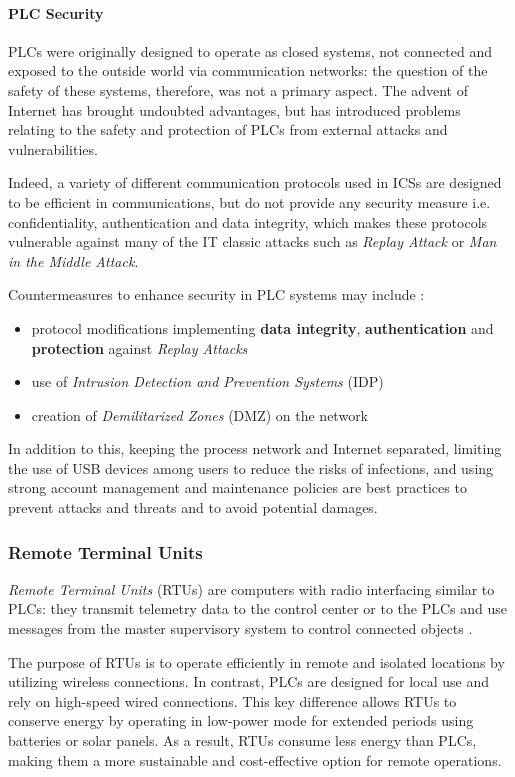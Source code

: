 \paragraph{PLC Security}
\label{subsubsec:2_plc_security}
PLCs were originally designed to operate as closed systems, not connected and exposed to the outside world via communication networks: the question of the safety of these systems, therefore, was not a primary aspect. The advent of  Internet has brought undoubted advantages, but has introduced problems relating to the safety and protection of PLCs from external attacks and vulnerabilities.

Indeed, a variety of different communication protocols used in ICSs are designed to be efficient in communications, but do not provide any security measure i.e. confidentiality, authentication and data integrity, which makes these protocols vulnerable against many of the IT classic attacks such as \textit{Replay Attack} or \textit{Man in the Middle Attack}. 

\bigskip
Countermeasures to enhance security in PLC systems may include \cite{plc_security}:
\begin{itemize}
	\item protocol modifications implementing \textbf{data integrity}, \textbf{authentication} and \textbf{protection} against \textit{Replay Attacks}
	\item use of \textit{Intrusion Detection and Prevention Systems} (IDP) 
	\item creation of \textit{Demilitarized Zones} (DMZ) on the network
\end{itemize}

In addition to this, keeping the process network and Internet separated, limiting the use of USB devices among users to reduce the risks of infections, and using strong account management and maintenance policies are best practices to prevent attacks and threats and to avoid potential damages. 

\subsubsection{Remote Terminal Units}
\label{subsubsec:2_rtu}
\textit{Remote Terminal Units} (RTUs) are computers with radio interfacing similar to PLCs: they transmit telemetry data to the control center or to the PLCs and use messages from the master supervisory system to control connected objects \cite{rtu_definition}.

\bigskip
The purpose of RTUs is to operate efficiently in remote and isolated locations by utilizing wireless connections. In contrast, PLCs are designed for local use and rely on high-speed wired connections. This key difference allows RTUs to conserve energy by operating in low-power mode for extended periods using batteries or solar panels. As a result, RTUs consume less energy than PLCs, making them a more sustainable and cost-effective option for remote operations.

